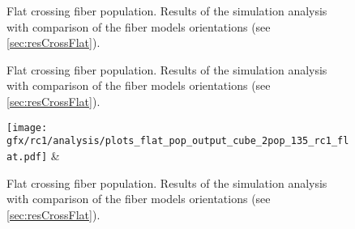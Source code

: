 %
\begin{figure}[!p]
\centering
{}
\caption{Flat crossing fiber population. Results of the simulation analysis with comparison of the fiber models orientations (see \cref{sec:resCrossFlat}).}
\label{app:flat_fiber_pop_c}
\end{figure}
%
\begin{figure}[!p]
\centering
{}
\caption{Flat crossing fiber population. Results of the simulation analysis with comparison of the fiber models orientations (see \cref{sec:resCrossFlat}).}
\label{app:flat_fiber_pop_d}
\end{figure}
%
\begin{figure}[!p]
\centering
\texttt{[image: gfx/rc1/analysis/plots\_flat\_pop\_output\_cube\_2pop\_135\_rc1\_flat.pdf]} &
\caption{Flat crossing fiber population. Results of the simulation analysis with comparison of the fiber models orientations (see \cref{sec:resCrossFlat}).}
\label{app:flat_fiber_pop_e}
\end{figure}
%
%
%
%
